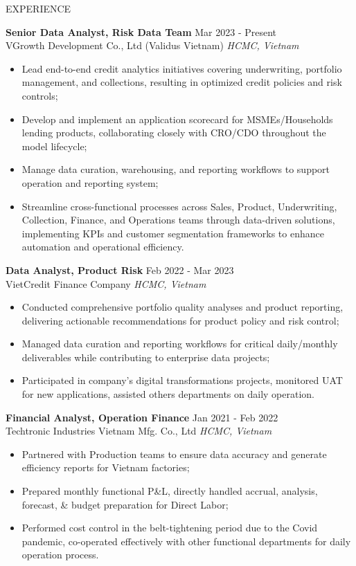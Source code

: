 \documentclass{resume} %
\begin{document}
\begin{rSection}{EXPERIENCE}

\textbf{Senior Data Analyst, Risk Data Team} \hfill Mar 2023 - Present\\
VGrowth Development Co., Ltd (Validus Vietnam) \hfill \textit{HCMC, Vietnam}
 \begin{itemize}
    \itemsep -3pt {} 
     \item Lead end-to-end credit analytics initiatives covering underwriting, portfolio management, and collections, resulting in optimized credit policies and risk controls;
     \item Develop and implement an application scorecard for MSMEs/Households lending products, collaborating closely with CRO/CDO throughout the model lifecycle;
     \item Manage data curation, warehousing, and reporting workflows to support operation and reporting system;
     \item Streamline cross-functional processes across Sales, Product, Underwriting, Collection, Finance, and Operations teams through data-driven solutions, implementing KPIs and customer segmentation frameworks to enhance automation and operational efficiency.
 \end{itemize}
 
\textbf{Data Analyst, Product Risk} \hfill Feb 2022 - Mar 2023\\
VietCredit Finance Company \hfill \textit{HCMC, Vietnam}
 \begin{itemize}
    \itemsep -3pt {} 
     \item Conducted comprehensive portfolio quality analyses and product reporting, delivering actionable recommendations for product policy and risk control;
     \item Managed data curation and reporting workflows for critical daily/monthly deliverables while contributing to enterprise data projects;
     \item Participated in company’s digital transformations projects, monitored UAT for new applications, assisted others departments on daily operation.
 \end{itemize}

\textbf{Financial Analyst, Operation Finance} \hfill Jan 2021 - Feb 2022\\
Techtronic Industries Vietnam Mfg. Co., Ltd \hfill \textit{HCMC, Vietnam}
 \begin{itemize}
    \itemsep -3pt {} 
     \item Partnered with Production teams to ensure data accuracy and generate efficiency reports for Vietnam factories;
     \item Prepared monthly functional P\&L, directly handled accrual, analysis, forecast, \& budget preparation for Direct Labor;
     \item Performed cost control in the belt-tightening period due to the Covid pandemic, co-operated effectively with other functional departments for daily operation process.
 \end{itemize}


\end{rSection}
\end{document}
